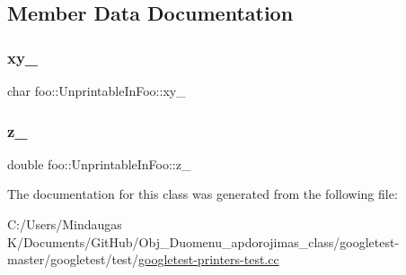 \subsection{Member Data Documentation}
\mbox{\label{classfoo_1_1_unprintable_in_foo_a384844cba2972090c627810356e20efc}} 
\subsubsection{\texorpdfstring{xy\_}{xy\_}}
{\footnotesize\ttfamily char foo\+::\+Unprintable\+In\+Foo\+::xy\+\_\+\hspace{0.3cm}{\ttfamily [private]}}

\mbox{\label{classfoo_1_1_unprintable_in_foo_a48136583cf853dcb112f46d33eb7b8eb}} 
\subsubsection{\texorpdfstring{z\_}{z\_}}
{\footnotesize\ttfamily double foo\+::\+Unprintable\+In\+Foo\+::z\+\_\+\hspace{0.3cm}{\ttfamily [private]}}



The documentation for this class was generated from the following file\+:\begin{DoxyCompactItemize}
\item 
C\+:/\+Users/\+Mindaugas K/\+Documents/\+Git\+Hub/\+Obj\+\_\+\+Duomenu\+\_\+apdorojimas\+\_\+class/googletest-\/master/googletest/test/\mbox{\hyperlink{googletest-master_2googletest_2test_2googletest-printers-test_8cc}{googletest-\/printers-\/test.\+cc}}\end{DoxyCompactItemize}
